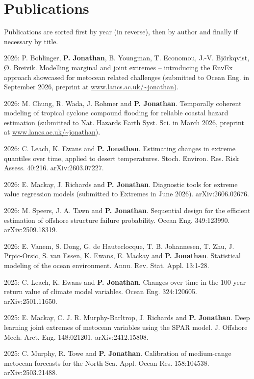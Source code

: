 \documentclass[11pt,a4paper]{moderncv}
\begin{document}
\section{Publications}
Publications are sorted first by year (in reverse), then by author and finally if necessary by title. 
\vspace{5pt}

2026: P. Bohlinger,  \textbf{P. Jonathan}, B. Youngman, T. Economou, J.-V. Björkqvist, Ø. Breivik. Modelling marginal and joint extremes – introducing the EnvEx approach showcased for metocean related challenges (submitted to Ocean Eng. in September 2026, preprint at \url{www.lancs.ac.uk/~jonathan}).

2026: M. Chung, R. Wada, J. Rohmer and \textbf{P. Jonathan}. Temporally coherent modeling of tropical cyclone compound flooding for reliable coastal hazard estimation (submitted to Nat. Hazards Earth Syst. Sci. in March 2026, preprint at \url{www.lancs.ac.uk/~jonathan}).

2026: C. Leach, K. Ewans and \textbf{P. Jonathan}. Estimating changes in extreme quantiles over time, applied to desert temperatures. Stoch. Environ. Res. Risk Assess. 40:216. arXiv:2603.07227.

2026: E. Mackay, J. Richards and \textbf{P. Jonathan}. Diagnostic tools for extreme value regression models (submitted to Extremes in June 2026). arXiv:2606.02676.

2026: M. Speers, J. A. Tawn and \textbf{P. Jonathan}. Sequential design for the efficient estimation of offshore structure failure probability. Ocean Eng. 349:123990. arXiv:2509.18319.

2026: E. Vanem, S. Dong, G. de Hauteclocque, T. B. Johannesen, T. Zhu, J. Prpic-Orsic, S. van Essen, K. Ewans, E. Mackay and \textbf{P. Jonathan}. Statistical modeling of the ocean environment. Annu. Rev. Stat. Appl. 13:1-28.

2025: C. Leach, K. Ewans and \textbf{P. Jonathan}. Changes over time in the 100-year return value of climate model variables. Ocean Eng. 324:120605. arXiv:2501.11650.

2025: E. Mackay, C. J. R. Murphy-Barltrop, J. Richards and \textbf{P. Jonathan}. Deep learning joint extremes of metocean variables using the SPAR model. J. Offshore Mech. Arct. Eng.  148:021201. arXiv:2412.15808.

2025: C. Murphy, R. Towe and \textbf{P. Jonathan}. Calibration of medium-range metocean forecasts for the North Sea. Appl. Ocean Res. 158:104538. arXiv:2503.21488.
\end{document}
